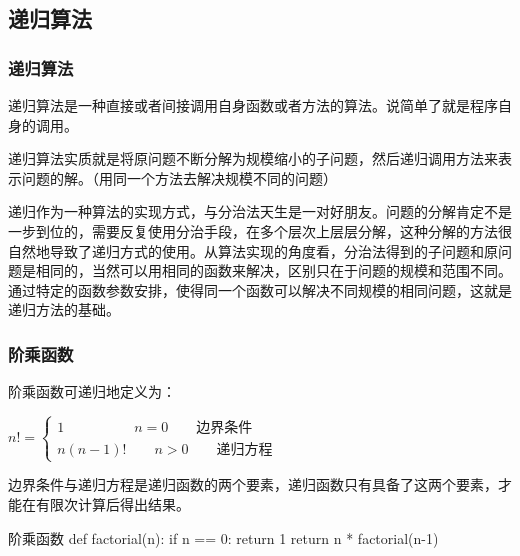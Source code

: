 \subsection{递归算法}

\begin{frame}
    \frametitle{递归算法}
    递归算法是一种直接或者间接调用自身函数或者方法的算法。说简单了就是程序自身的调用。

    递归算法实质就是将原问题不断分解为规模缩小的子问题，然后递归调用方法来表示问题的解。（用同一个方法去解决规模不同的问题）

    递归作为一种算法的实现方式，与分治法天生是一对好朋友。问题的分解肯定不是一步到位的，需要反复使用分治手段，在多个层次上层层分解，这种分解的方法很自然地导致了递归方式的使用。从算法实现的角度看，分治法得到的子问题和原问题是相同的，当然可以用相同的函数来解决，区别只在于问题的规模和范围不同。通过特定的函数参数安排，使得同一个函数可以解决不同规模的相同问题，这就是递归方法的基础。
\end{frame}

\begin{frame}[fragile]
    \frametitle{阶乘函数}
      阶乘函数可递归地定义为：
      \smallskip

      $n! = \begin{cases}
        1 \qquad \qquad  \quad n=0 \qquad \text{边界条件}\\
        n(n-1)! \qquad n>0  \qquad \text{递归方程}
      \end{cases}$
      \smallskip

      边界条件与递归方程是递归函数的两个要素，递归函数只有具备了这两个要素，才能在有限次计算后得出结果。
      \bigskip
\begin{codeblock}{阶乘函数}
  def factorial(n):
      if n == 0:
          return 1
  return n * factorial(n-1)
\end{codeblock}
\end{frame}

